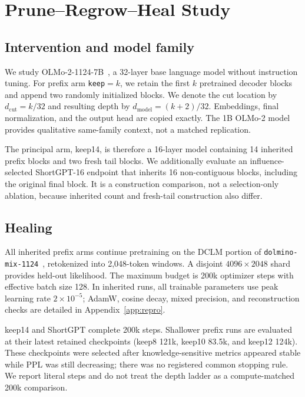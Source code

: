 \section{Prune--Regrow--Heal Study}
\label{sec:method}

\subsection{Intervention and model family}
We study OLMo-2-1124-7B~\citep{olmo2}, a 32-layer base language model without
instruction tuning. For prefix arm \texttt{keep}$=k$, we retain the first $k$
pretrained decoder blocks and append two randomly initialized blocks. We denote
the cut location by $d_{\mathrm{cut}}=k/32$ and resulting depth by
$d_{\mathrm{model}}=(k+2)/32$. Embeddings, final normalization, and the output
head are copied exactly. The 1B OLMo-2 model provides qualitative same-family
context, not a matched replication.

The principal arm, keep14, is therefore a 16-layer model containing 14 inherited
prefix blocks and two fresh tail blocks. We additionally evaluate an
influence-selected ShortGPT-16 endpoint that inherits 16 non-contiguous blocks,
including the original final block. It is a construction comparison, not a
selection-only ablation, because inherited count and fresh-tail construction
also differ.

\subsection{Healing}
All inherited prefix arms continue pretraining on the DCLM portion of
\texttt{dolmino-mix-1124}~\citep{dolma}, retokenized into 2,048-token windows. A disjoint
$4096\times2048$ shard provides held-out likelihood. The maximum budget is
200k optimizer steps with effective batch size 128. In inherited runs, all
trainable parameters use peak learning rate $2\times10^{-5}$; AdamW, cosine
decay, mixed precision, and reconstruction checks are detailed in
Appendix~\ref{app:repro}.

keep14 and ShortGPT complete 200k steps. Shallower prefix runs are evaluated at
their latest retained checkpoints (keep8 121k, keep10 83.5k, and keep12 124k).
These checkpoints were selected after knowledge-sensitive metrics appeared
stable while PPL was still decreasing; there was no registered common stopping
rule. We report literal steps and do not treat the depth ladder as a
compute-matched 200k comparison.

